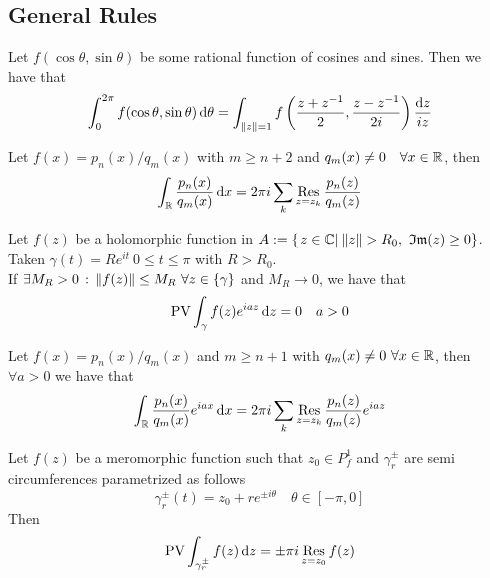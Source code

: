 \documentclass[../complete.tex]{subfiles}
\begin{document}
\subsection{General Rules}
\begin{thm}
	Let $f(\cos\theta,\sin\theta)$ be some rational function of cosines and sines. Then we have that
	\begin{equation}
		\int_{0}^{2\pi}f(\cos\theta,\sin\theta)\operatorname{d\!}\theta=\int_{\norm{z}=1}^{}f\left( \frac{z+z^{-1}}{2},\frac{z-z^{-1}}{2i} \right)\frac{\operatorname{d\!} z}{iz}
		\label{eq:trigint}
	\end{equation}
\end{thm}
\begin{thm}
	Let $f(x)=p_n(x)/q_m(x)$ with $m\ge n+2$ and $q_m(x)\ne0\quad\forall x\in\mathbb{R}$, then
	\begin{equation}
		\int_{\mathbb{R}}^{}\frac{p_n(x)}{q_m(x)}\operatorname{d\!} x=2\pi i\sum_{k}\operatorname*{\mathrm{Res}}_{z=z_k}\frac{p_n(z)}{q_m(z)}
		\label{eq:rationalfunc}
	\end{equation}
\end{thm}
\begin{lem}
	Let $f(z)$ be a holomorphic function in $A:=\left\{ \left.z\in\mathbb{C}\right|_{}\norm{z}>R_0,\ \mathfrak{Im}(z)\ge0 \right\}$. Taken $\gamma(t)=Re^{it}\ 0\le t\le\pi$ with $R>R_0$.\\
	If $\exists M_R>0\st\norm{f(z)}\le M_R\ \forall z\in\{\gamma\}$ and $M_R\to0$, we have that
	\begin{equation}
		\operatorname{\mathrm{PV}}\int_{\gamma}^{}f(z)e^{iaz}\operatorname{d\!} z=0\quad a>0
		\label{eq:jordanlemma}
	\end{equation}
\end{lem}
\begin{thm}
	Let $f(x)=p_n(x)/q_m(x)$ and $m\ge n+1$ with $q_m(x)\ne0\ \forall x\in\mathbb{R}$, then $\forall a>0$ we have that
	\begin{equation}
		\int_{\mathbb{R}}^{}\frac{p_n(x)}{q_m(x)}e^{iax}\operatorname{d\!} x=2\pi i\sum_k\operatorname*{\mathrm{Res}}_{z=z_k}\frac{p_n(z)}{q_m(z)}e^{iaz}
		\label{eq:fracfourierint}
	\end{equation}
\end{thm}
\begin{lem}
	Let $f(z)$ be a meromorphic function such that $z_0\in P^1_f$ and $\gamma_r^{\pm}$ are semi circumferences parametrized as follows
	\begin{equation*}
		\gamma_r^{\pm}(t)=z_0+re^{\pm i\theta}\quad\theta\in[-\pi,0]
	\end{equation*}
	Then
	\begin{equation}
		\operatorname{\mathrm{PV}}\int_{\gamma_r^\pm}^{}f(z)\operatorname{d\!} z=\pm\pi i\operatorname*{\mathrm{Res}}_{z=z_0}f(z)
		\label{eq:singlesimplepole}
	\end{equation}
\end{lem}
\end{document}
